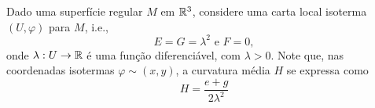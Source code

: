 %

%

Dado uma superfície regular $M$ em $\mathbb{R}^3$, considere uma carta local isoterma $(U,\varphi)$ para $M$, i.e., 
\begin{equation*}
E = G = \lambda^2 \text{ e } F=0,
\end{equation*}
onde $\lambda: U \rightarrow \mathbb{R}$ é uma função diferenciável, com $\lambda > 0$. Note que, nas coordenadas isotermas $\varphi \sim (x,y)$, a curvatura média $H$ se expressa como
\begin{equation*}
H = \frac{e + g}{2 \lambda^2}
\end{equation*}

